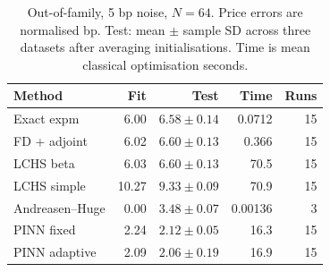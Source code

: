 \begin{table}[t]\centering\caption{Out-of-family, 5 bp noise, $N=64$. Price errors are normalised bp. Test: mean $\pm$ sample SD across three datasets after averaging initialisations. Time is mean classical optimisation seconds.}
\label{tab:bench}\scriptsize\begin{tabular}{lrrrr}\toprule Method & Fit & Test & Time & Runs\\\midrule
Exact expm & 6.00 & $6.58\pm0.14$ & 0.0712 & 15\\
FD + adjoint & 6.02 & $6.60\pm0.13$ & 0.366 & 15\\
LCHS beta & 6.03 & $6.60\pm0.13$ & 70.5 & 15\\
LCHS simple & 10.27 & $9.33\pm0.09$ & 70.9 & 15\\
Andreasen--Huge & 0.00 & $3.48\pm0.07$ & 0.00136 & 3\\
PINN fixed & 2.24 & $2.12\pm0.05$ & 16.3 & 15\\
PINN adaptive & 2.09 & $2.06\pm0.19$ & 16.9 & 15\\
\bottomrule\end{tabular}\end{table}